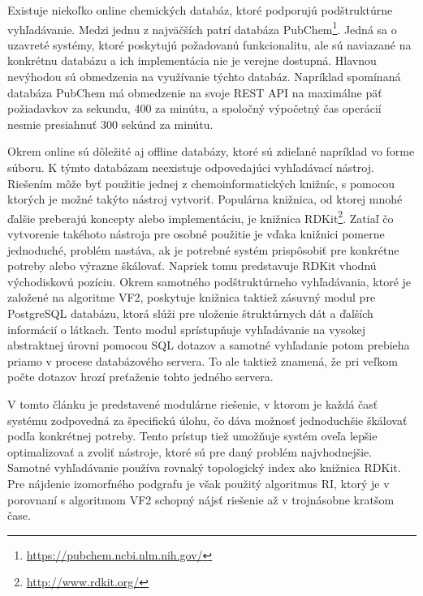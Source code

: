 \documentclass[slovak]{ExcelAtFIT} %
\begin{document}
Existuje niekoľko online chemických databáz, ktoré podporujú podštruktúrne vyhľadávanie. Medzi jednu z najväčších patrí databáza PubChem\footnote{\url{https://pubchem.ncbi.nlm.nih.gov/}}. Jedná sa o uzavreté systémy, ktoré poskytujú požadovanú funkcionalitu, ale sú naviazané na konkrétnu databázu a ich implementácia nie je verejne dostupná. Hlavnou nevýhodou sú obmedzenia na využívanie týchto databáz. Napríklad spomínaná databáza PubChem má obmedzenie na svoje REST API na maximálne päť požiadavkov za sekundu, 400 za minútu, a spoločný výpočetný čas operácií nesmie presiahnuť 300 sekúnd za minútu. 

Okrem online sú dôležité aj offline databázy, ktoré sú zdieľané napríklad vo forme súboru. K týmto databázam neexistuje odpovedajúci vyhľadávací nástroj. Riešením môže byť použitie jednej z chemoinformatických knižníc, s pomocou ktorých je možné takýto nástroj vytvoriť. Populárna knižnica, od ktorej mnohé ďalšie preberajú koncepty alebo implementáciu, je knižnica RDKit\footnote{\url{http://www.rdkit.org/}}. Zatiaľ čo vytvorenie takéhoto nástroja pre osobné použitie je vďaka knižnici pomerne jednoduché, problém nastáva, ak je potrebné systém prispôsobiť pre konkrétne potreby alebo výrazne škálovať. Napriek tomu predstavuje RDKit vhodnú východiskovú pozíciu. Okrem samotného podštruktúrneho vy\-hľa\-dá\-va\-nia, ktoré je založené na algoritme VF2, poskytuje knižnica taktiež zásuvný modul pre PostgreSQL databázu, ktorá slúži pre uloženie štruktúrnych dát a ďalších informácií o látkach. Tento modul sprístupňuje vyhľadávanie na vysokej abstraktnej úrovni pomocou SQL dotazov a samotné vyhľadanie potom prebieha priamo v procese databázového servera. To ale taktiež znamená, že pri veľkom počte dotazov hrozí preťaženie tohto jedného servera.

V tomto článku je predstavené modulárne riešenie, v ktorom je každá časť systému zodpovedná za špecifickú úlohu, čo dáva možnosť jednoduchšie škálovať podľa konkrétnej potreby. Tento prístup tiež umožňuje systém oveľa lepšie optimalizovať a zvoliť nástroje, ktoré sú pre daný problém najvhodnejšie. Samotné vyhľadávanie používa rovnaký topologický index ako knižnica RDKit. Pre nájdenie izomorfného podgrafu je však použitý algoritmus RI, ktorý je v porovnaní s algoritmom VF2 schopný nájsť riešenie až v trojnásobne kratšom čase. 
\end{document}
